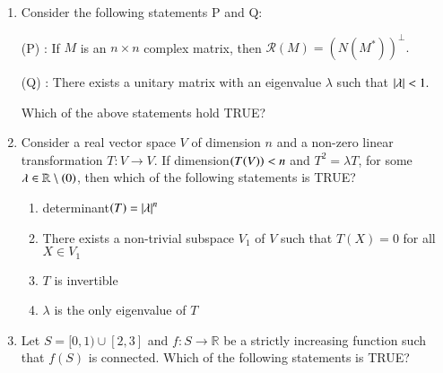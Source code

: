 \documentclass[journal]{IEEEtran}
\numberwithin{equation}{enumi}
\numberwithin{figure}{enumi}
\begin{document}
\begin{enumerate}
\hfill{}

\item Consider the following statements P and Q:

(P) : If $M$ is an $n \times n$ complex matrix, then $\mathcal{R}(M) = (N(M^*))^\perp.$

(Q) : There exists a unitary matrix with an eigenvalue $\lambda$ such that $\left\vert\lambda\right\vert < 1.$

Which of the above statements hold TRUE?

\begin{enumerate}
\end{enumerate}

\hfill{}

\item Consider a real vector space $V$ of dimension $n$ and a non-zero linear transformation $T : V \to V$. If dimension$\left(T(V)\right) < n$ and $T^2 = \lambda T$, for some $\lambda \in \mathbb{R} \setminus \left(0\right)$, then which of the following statements is TRUE?

\begin{enumerate}

\item determinant$\left(T\right) = \left\vert\lambda\right\vert^n$
\item There exists a non-trivial subspace $V_1$ of $V$ such that $T(X) = 0$ for all $X \in V_1$
\item $T$ is invertible
\item $\lambda$ is the only eigenvalue of $T$

\end{enumerate}

\hfill{}

\item Let $S = [0, 1) \cup [2, 3]$ and $f : S \to \mathbb{R}$ be a strictly increasing function such that $f(S)$ is connected. Which of the following statements is TRUE?

\begin{enumerate}
\end{enumerate}


\end{enumerate}
\end{document}
